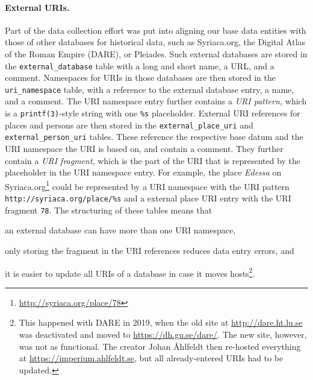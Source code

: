\paragraph{External URIs.}
Part of the data collection effort was put into aligning our base data entities with those of other databases for historical data, such as Syriaca.org, the Digital Atlas of the Roman Empire (DARE), or Pleiades.
Such external databases are stored in the \verb!external_database! table with a long and short name, a URL, and a comment.
Namespaces for URIs in those databases are then stored in the \verb!uri_namespace! table, with a reference to the external database entry, a name, and a comment.
The URI namespace entry further contains a \emph{URI pattern,} which is a \verb!printf(3)!-style string with one \verb!%s! placeholder.
External URI references for places and persons are then stored in the \verb!external_place_uri! and \verb!external_person_uri! tables.
These reference the respective base datum and the URI namespace the URI is based on, and contain a comment.
They further contain a \emph{URI fragment}, which is the part of the URI that is represented by the placeholder in the URI namespace entry.
For example, the place \emph{Edessa} on Syriaca.org\footnote{\url{http://syriaca.org/place/78}} could be represented by a URI namespace with the URI pattern \verb!http://syriaca.org/place/%s! and a external place URI entry with the URI fragment \verb!78!.
The structuring of these tables means that
\begin{enumerate*}[label=(\arabic*)]
  \item an external database can have more than one URI namespace,
  \item only storing the fragment in the URI references reduces data entry errors, and
  \item it is easier to update all URIs of a database in case it moves hosts\footnote{%
      This happened with DARE in 2019, when the old site at \url{http://dare.ht.lu.se} was deactivated and moved to \url{https://dh.gu.se/dare/}.
      The new site, however, was not as functional.
      The creator Johan Åhlfeldt then re-hosted everything at \url{https://imperium.ahlfeldt.se}, but all already-entered URIs had to be updated.
      }.
\end{enumerate*}


